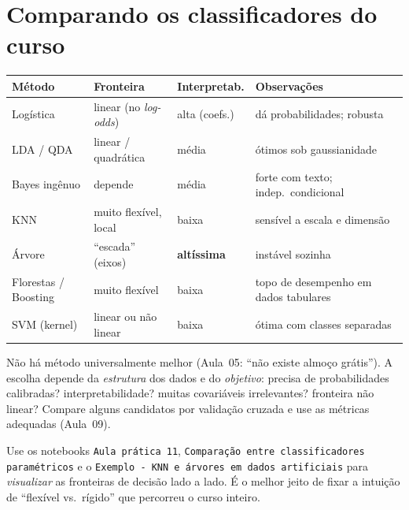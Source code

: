 \documentclass[11pt,a4paper]{article}
\begin{document}
\section{Comparando os classificadores do curso}
\begin{center}\small
\renewcommand{\arraystretch}{1.3}
\begin{tabular}{@{}lp{3.5cm}p{3.2cm}p{3.6cm}@{}}
\toprule
\textbf{Método} & \textbf{Fronteira} & \textbf{Interpretab.} & \textbf{Observações} \\
\midrule
Logística & linear (no \emph{log-odds}) & alta (coefs.) & dá probabilidades; robusta \\
LDA / QDA & linear / quadrática & média & ótimos sob gaussianidade \\
Bayes ingênuo & depende & média & forte com texto; indep.\ condicional \\
KNN & muito flexível, local & baixa & sensível a escala e dimensão \\
Árvore & ``escada'' (eixos) & \textbf{altíssima} & instável sozinha \\
Florestas / Boosting & muito flexível & baixa & topo de desempenho em dados tabulares \\
SVM (kernel) & linear ou não linear & baixa & ótima com classes separadas \\
\bottomrule
\end{tabular}
\end{center}

\begin{ideia}
Não há método universalmente melhor (Aula~05: ``não existe almoço grátis''). A
escolha depende da \emph{estrutura} dos dados e do \emph{objetivo}: precisa de
probabilidades calibradas? interpretabilidade? muitas covariáveis irrelevantes?
fronteira não linear? Compare alguns candidatos por validação cruzada e use as
métricas adequadas (Aula~09).
\end{ideia}

\begin{emsala}
Use os notebooks \texttt{Aula prática 11}, \texttt{Comparação entre classificadores
paramétricos} e o
\texttt{Exemplo - KNN e árvores em dados artificiais} para \emph{visualizar} as
fronteiras de decisão lado a lado. É o melhor jeito de fixar a intuição de
``flexível vs.\ rígido'' que percorreu o curso inteiro.
\end{emsala}
\end{document}
